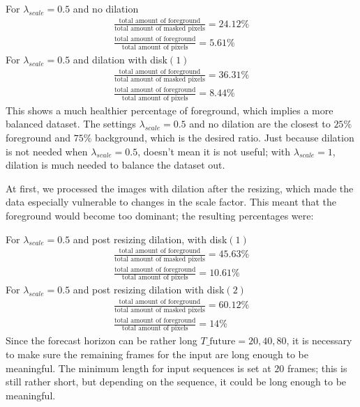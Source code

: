 \documentclass[a4paper,12pt]{article}
\begin{document}
For $\lambda_{scale} = 0.5$ and no dilation
\begin{align*}
\frac{\text{total amount of foreground}}{\text{total amount of masked pixels}} = 24.12\%\\
\frac{\text{total amount of foreground}}{\text{total amount of pixels}} = 5.61\%
\end{align*}
For $\lambda_{scale} = 0.5$ and dilation with disk$(1)$
\begin{align*}
\frac{\text{total amount of foreground}}{\text{total amount of masked pixels}} = 36.31\%\\
\frac{\text{total amount of foreground}}{\text{total amount of pixels}} = 8.44\%
\end{align*}
This shows a much healthier percentage of foreground, which implies a more balanced dataset. The settings $\lambda_{scale} = 0.5$ and no dilation are the closest to $25\%$ foreground and $75\%$ background, which is the desired ratio. Just because dilation is not needed when $\lambda_{scale}=0.5$, doesn't mean it is not useful; with $\lambda_{scale}=1$, dilation is much needed to balance the dataset out.




At first, we processed the images with dilation after the resizing, which made the data especially vulnerable to changes in the scale factor. This meant that the foreground would become too dominant; the resulting percentages were:


For $\lambda_{scale} = 0.5$ and post resizing dilation, with disk$(1)$
\begin{align*}
\frac{\text{total amount of foreground}}{\text{total amount of masked pixels}} = 45.63\%\\
\frac{\text{total amount of foreground}}{\text{total amount of pixels}} = 10.61\%
\end{align*}
For $\lambda_{scale} = 0.5$ and post resizing dilation with disk$(2)$
\begin{align*}
\frac{\text{total amount of foreground}}{\text{total amount of masked pixels}} = 60.12\%\\
\frac{\text{total amount of foreground}}{\text{total amount of pixels}} = 14\%
\end{align*}
Since the forecast horizon can be rather long $T\_\text{future} = 20, 40, 80$, it is necessary to make sure the remaining frames for the input are long enough to be meaningful. The minimum length for input sequences is set at $20$ frames; this is still rather short, but depending on the sequence, it could be long enough to be meaningful.
\end{document}
